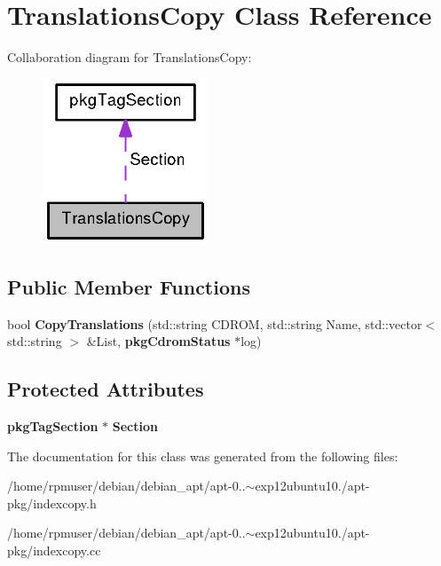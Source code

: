 \section{\-Translations\-Copy \-Class \-Reference}
\label{classTranslationsCopy}


\-Collaboration diagram for \-Translations\-Copy\-:
\nopagebreak
\begin{figure}[H]
\begin{center}
\leavevmode
\includegraphics[width=140pt]{classTranslationsCopy__coll__graph}
\end{center}
\end{figure}
\subsection*{\-Public \-Member \-Functions}
\begin{DoxyCompactItemize}
\item 
bool {\bfseries \-Copy\-Translations} (std\-::string \-C\-D\-R\-O\-M, std\-::string \-Name, std\-::vector$<$ std\-::string $>$ \&\-List, {\bf pkg\-Cdrom\-Status} $\ast$log)\label{classTranslationsCopy_a8afd344fd71a70fcaed4e21aabf01b0d}

\end{DoxyCompactItemize}
\subsection*{\-Protected \-Attributes}
\begin{DoxyCompactItemize}
\item 
{\bf pkg\-Tag\-Section} $\ast$ {\bfseries \-Section}\label{classTranslationsCopy_a076d8619a9760c7e1bcb3bc49711fedf}

\end{DoxyCompactItemize}


\-The documentation for this class was generated from the following files\-:\begin{DoxyCompactItemize}
\item 
/home/rpmuser/debian/debian\-\_\-apt/apt-\/0..$\sim$exp12ubuntu10./apt-\/pkg/indexcopy.\-h\item 
/home/rpmuser/debian/debian\-\_\-apt/apt-\/0..$\sim$exp12ubuntu10./apt-\/pkg/indexcopy.\-cc\end{DoxyCompactItemize}
